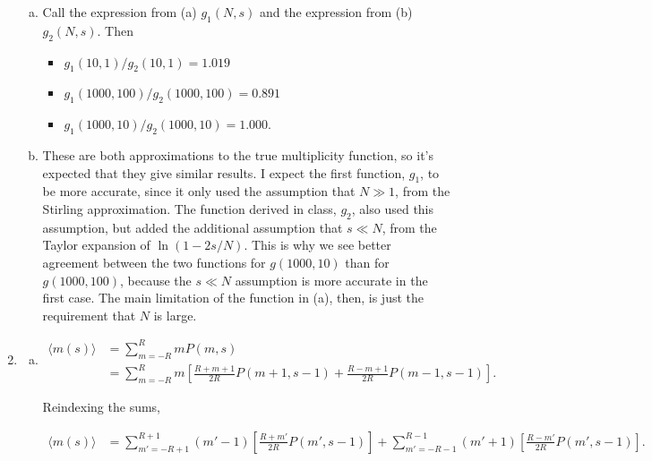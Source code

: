 \documentclass{article}
\begin{document}
\begin{enumerate}
\begin{enumerate}[(a)]
	\item

	Call the expression from (a) $g_1(N,s)$ and the expression from (b) $g_2(N,s)$. Then 

	\begin{itemize}

		\item

		$g_1(10, 1) / g_2(10, 1) = 1.019$

		\item

		$g_1(1000,100) / g_2(1000,100) = 0.891$

		\item

		$g_1(1000, 10) / g_2(1000, 10) = 1.000.$

	\end{itemize}

	\item

	These are both approximations to the true multiplicity function, so it's expected that they give similar results. I expect the first function, $g_1$, to be more accurate, since it only used the assumption that $N \gg 1$, from the Stirling approximation. The function derived in class, $g_2$, also used this assumption, but added the additional assumption that $s \ll N$, from the Taylor expansion of $\ln(1 - 2s/N)$. This is why we see better agreement between the two functions for $g(1000, 10)$ than for $g(1000, 100)$, because the $s \ll N$ assumption is more accurate in the first case. The main limitation of the function in (a), then, is just the requirement that $N$ is large.

	\end{enumerate}

\item 

	\begin{enumerate}[(a)]

	\item

	\begin{align*}
	\langle m(s) \rangle &= \sum \limits_{m=-R}^R mP(m,s) \\
	&= \sum \limits_{m=-R}^R m \left[ \frac{R+m+1}{2R} P(m+1,s-1) + \frac{R-m+1}{2R} P(m-1, s-1) \right].
	\end{align*}

	Reindexing the sums,

	\begin{align*}
	\langle m(s) \rangle &= \sum \limits_{m'=-R+1}^{R+1} (m'-1) \left[ \frac{R+m'}{2R} P(m',s-1) \right] + \sum \limits_{m'=-R-1}^{R-1} (m'+1) \left[ \frac{R-m'}{2R} P(m', s-1) \right].
	\end{align*}


\end{enumerate}
\end{enumerate}
\end{document}
